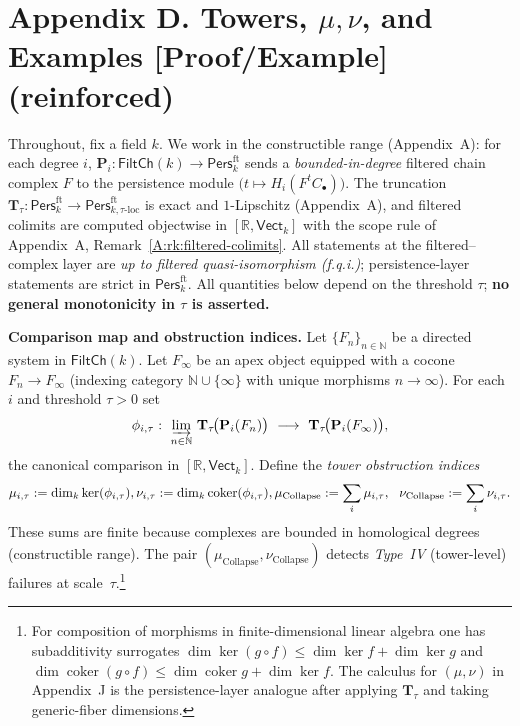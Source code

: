 \documentclass[11pt]{article}
\newcommand{\Pers}{\mathsf{Pers}}
\numberwithin{equation}{section}
\theoremstyle{definition}
\DeclareRobustCommand{\muc}{\mu_{\mathrm{Collapse}}}
\DeclareRobustCommand{\nuc}{\nu_{\mathrm{Collapse}}}
\providecommand{\n}{\unskip\space}
\begin{document}
\section*{Appendix D. Towers, \texorpdfstring{$\mu,\nu$}{mu,nu}, and Examples [Proof/Example] (reinforced)}


Throughout, fix a field \(k\).
We work in the constructible range (Appendix~A): for each degree \(i\),
\(\mathbf{P}_i:\mathsf{FiltCh}(k)\to\Pers^{\mathrm{ft}}_k\) sends a \emph{bounded-in-degree} filtered chain complex \(F\) to the persistence module
\(\big(t\mapsto H_i(F^{t}C_\bullet)\big)\).
The truncation \(\mathbf{T}_\tau:\Pers^{\mathrm{ft}}_k\to\Pers^{\mathrm{ft}}_{k,\tau\text{-loc}}\) is exact and \(1\)-Lipschitz (Appendix~A), and filtered colimits are computed objectwise in \([\mathbb{R},\mathsf{Vect}_k]\) with the scope rule of Appendix~A, Remark~\ref{A:rk:filtered-colimits}.
All statements at the filtered–complex layer are \emph{up to filtered quasi-isomorphism (f.q.i.)}; persistence-layer statements are strict in \(\Pers^{\mathrm{ft}}_k\).
All quantities below depend on the threshold \(\tau\); \textbf{no general monotonicity in \(\tau\) is asserted.}

\medskip
\noindent\textbf{Comparison map and obstruction indices.}
Let \(\{F_n\}_{n\in\mathbb{N}}\) be a directed system in \(\mathsf{FiltCh}(k)\).
Let \(F_\infty\) be an apex object equipped with a cocone \(F_n\to F_\infty\) (indexing category \(\mathbb{N}\cup\{\infty\}\) with unique morphisms \(n\to\infty\)).
For each \(i\) and threshold \(\tau>0\) set
\[
\phi_{i,\tau}:\ \varinjlim_{n\in\mathbb{N}}\, \mathbf{T}_\tau\!\big(\mathbf{P}_i(F_n)\big)\ \longrightarrow\ \mathbf{T}_\tau\!\big(\mathbf{P}_i(F_\infty)\big),
\]
the canonical comparison in \([\mathbb{R},\mathsf{Vect}_k]\).
Define the \emph{tower obstruction indices}
\[
\mu_{i,\tau}:=\dim_k\ker(\phi_{i,\tau}),\qquad\n\nu_{i,\tau}:=\dim_k\mathrm{coker}(\phi_{i,\tau}),\qquad\n\muc:=\sum_i\mu_{i,\tau},\ \ \nuc:=\sum_i\nu_{i,\tau}.
\]
These sums are finite because complexes are bounded in homological degrees (constructible range).
The pair \((\muc,\nuc)\) detects \emph{Type~IV} (tower-level) failures at scale~\(\tau\).\footnote{For composition of morphisms in finite-dimensional linear algebra one has subadditivity surrogates
\(\dim\ker(g\circ f)\le \dim\ker f+\dim\ker g\) and
\(\dim\operatorname{coker}(g\circ f)\le \dim\operatorname{coker} g+\dim\ker f\).
The calculus for \((\mu,\nu)\) in Appendix~J is the persistence-layer analogue after applying \(\mathbf{T}_\tau\) and taking generic-fiber dimensions.}
\end{document}
